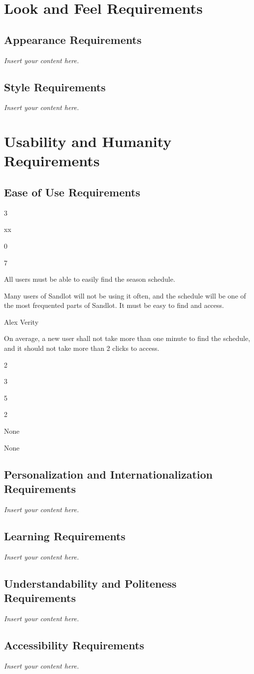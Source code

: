 \documentclass[12pt]{article}
\newenvironment{myreq}[1]{%
\setlist[description]{font=\normalfont\color{darkgray}}%
\begin{tcolorbox}[colframe=black,colback=white, sharp corners, boxrule=1pt]%
\bfseries\color{blue}%
\begin{description}#1}%
{\end{description}\end{tcolorbox}}
\newcommand{\threeinline}[3]{\begin{multicols}{3}#1 #2 #3\end{multicols}}
\newcommand{\twoinline}[2]{\begin{multicols}{2}#1 #2\end{multicols}}
\newcommand{\reqno}{\item[Requirement \#:]}
\newcommand{\reqtype}{\item[Requirement Type:]}
\newcommand{\reqevent}{\item[Event/BUC/PUC \#:]}
\newcommand{\reqdesc}{\item[Description:]}
\newcommand{\reqrat}{\item[Rationale:]}
\newcommand{\reqorig}{\item[Originator:]}
\newcommand{\reqfit}{\item[Fit Criterion:]}
\newcommand{\reqsatis}{\item[Customer Satisfaction:]}
\newcommand{\reqdissat}{\item[Customer Dissatisfaction:]}
\newcommand{\reqdep}{\item[Dependencies:]}
\newcommand{\reqconf}{\item[Conflicts:]}
\newcommand{\reqmater}{\item[Materials:]}
\newcommand{\reqhist}{\item[History:]}
\newcommand{\lips}{\textit{Insert your content here.}}
\begin{document}
\section{Look and Feel Requirements}
\subsection{Appearance Requirements}
\lips
\subsection{Style Requirements}
\lips

\section{Usability and Humanity Requirements}
\subsection{Ease of Use Requirements}

\begin{myreq}
  \threeinline
    {\reqno xx}
    {\reqtype 0}
    {\reqevent 7}
  \reqdesc All users must be able to easily find the season schedule.
  \reqrat Many users of Sandlot will not be using it often, and the
  schedule will be one of the most frequented parts of Sandlot. It must be
  easy to find and access. 
  \reqorig Alex Verity
  \reqfit On average, a new user shall not take more than one minute to find
  the schedule, and it should not take more than 2 clicks to access.
  \twoinline
    {\reqsatis 3}
    {\reqdissat 5}
  \twoinline
  {\reqdep None}
  {\reqconf None}
  \reqmater
  \reqhist
\end{myreq}

\subsection{Personalization and Internationalization Requirements}
\lips
\subsection{Learning Requirements}
\lips
\subsection{Understandability and Politeness Requirements}
\lips
\subsection{Accessibility Requirements}
\lips
\end{document}

